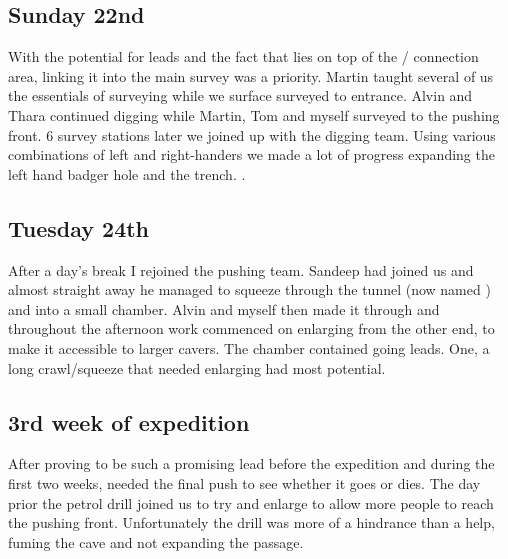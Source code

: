 \subsection{Sunday 22nd}

With the potential for leads and the fact that  lies on top of the
 /  connection area, linking it into the
main survey was a priority. Martin taught several of us the essentials
of surveying while we surface surveyed to  entrance. Alvin and Thara
continued digging while Martin, Tom and myself surveyed to the pushing
front. 6 survey stations later we joined up with the digging team. Using
various combinations of left and right-handers we made a lot of progress
expanding the left hand badger hole and the trench. .

\subsection{Tuesday 24th}

After a day's break I rejoined the  pushing team. Sandeep had joined
us and almost straight away he managed to squeeze through the tunnel
(now named ) and into a small chamber. Alvin and myself
then made it through and throughout the afternoon work commenced on
enlarging  from the other end, to make it accessible to
larger cavers. The chamber contained going leads. One, a long
crawl/squeeze that needed enlarging had most potential.

\subsection{3rd week of expedition}

After proving to be such a promising lead before the expedition and
during the first two weeks,  needed the final push to see
whether it goes or dies. The day prior the petrol drill joined us to try
and enlarge  to allow more people to reach the pushing
front. Unfortunately the drill was more of a hindrance than a help,
fuming the cave and not expanding the passage.


